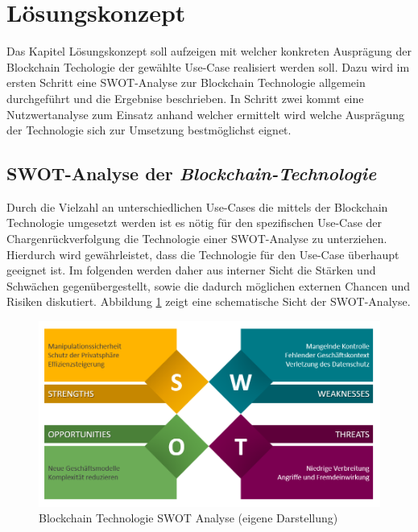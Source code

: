 \section{Lösungskonzept}
Das Kapitel Lösungskonzept soll aufzeigen mit welcher konkreten Ausprägung der Blockchain Techologie der gewählte Use-Case realisiert werden soll. Dazu wird im ersten Schritt eine SWOT-Analyse zur Blockchain Technologie allgemein durchgeführt und die Ergebnise beschrieben. In Schritt zwei kommt eine Nutzwertanalyse zum Einsatz anhand welcher ermittelt wird welche Ausprägung der Technologie sich zur Umsetzung bestmöglichst eignet.

\subsection{SWOT-Analyse der \textit{Blockchain-Technologie}} \label{swot-analyse}
Durch die Vielzahl an unterschiedlichen Use-Cases die mittels der Blockchain Technologie umgesetzt werden ist es nötig für den spezifischen Use-Case der Chargenrückverfolgung die Technologie einer SWOT-Analyse zu unterziehen. Hierdurch wird gewährleistet, dass die Technologie für den Use-Case überhaupt geeignet ist. Im folgenden werden daher aus interner Sicht die Stärken und Schwächen gegenübergestellt, sowie die dadurch möglichen externen Chancen und Risiken diskutiert. Abbildung \ref{fig:blockchain-technology-swot-analysis} zeigt eine schematische Sicht der SWOT-Analyse.

\begin{figure}[H]
	\centering
	\includegraphics[width=1\linewidth]{pictures/blockchain-technology-swot-analysis}
	\caption[Blockchain Technologie SWOT Analyse]{Blockchain Technologie SWOT Analyse (eigene Darstellung)}
	\label{fig:blockchain-technology-swot-analysis}
\end{figure}

